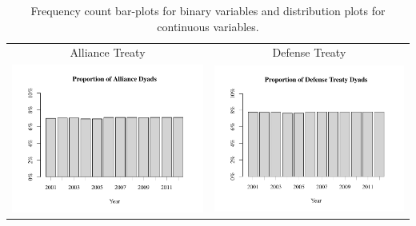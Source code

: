 \documentclass[reqno,onecolumn,letterpaper,12pt]{article}
\begin{document}
\clearpage

\begin{longtable}{c@{\hskip -.8cm}c}
\caption{\label{fig:sum_stats} Frequency count bar-plots for binary variables and distribution plots for continuous variables.}\\

Alliance Treaty &Defense Treaty\\ 
\includegraphics[height=.17\textheight, clip=true, trim=0cm 1cm 0cm 2cm]{SI_figures/descriptive_plots/alliance_barplot.pdf}    &
\includegraphics[height=.17\textheight, clip=true, trim=0cm 1cm 0cm 2cm]{SI_figures/descriptive_plots/defense_barplot.pdf}   \\


\end{longtable}
\end{document}
